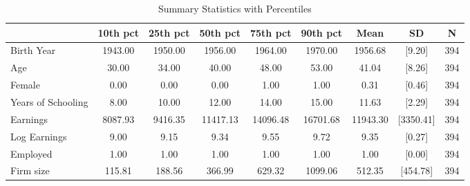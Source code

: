 \documentclass{article}
\begin{document}
\begin{table}[htbp] 
\centering 
\begin{threeparttable} 
\caption{Summary Statistics with Percentiles} 

\centering
\begin{tabular}{lllllllll}
\toprule
\multicolumn{1}{c}{} &
  \multicolumn{1}{c}{10th pct} &
  \multicolumn{1}{c}{25th pct} &
  \multicolumn{1}{c}{50th pct} &
  \multicolumn{1}{c}{75th pct} &
  \multicolumn{1}{c}{90th pct} &
  \multicolumn{1}{c}{Mean} &
  \multicolumn{1}{c}{SD} &
  \multicolumn{1}{c}{N} \\
\midrule
\multicolumn{1}{l}{Birth Year} &
  \multicolumn{1}{c}{1943.00} &
  \multicolumn{1}{c}{1950.00} &
  \multicolumn{1}{c}{1956.00} &
  \multicolumn{1}{c}{1964.00} &
  \multicolumn{1}{c}{1970.00} &
  \multicolumn{1}{c}{1956.68} &
  \multicolumn{1}{c}{[9.20]} &
  \multicolumn{1}{c}{394} \\
\multicolumn{1}{l}{Age} &
  \multicolumn{1}{c}{30.00} &
  \multicolumn{1}{c}{34.00} &
  \multicolumn{1}{c}{40.00} &
  \multicolumn{1}{c}{48.00} &
  \multicolumn{1}{c}{53.00} &
  \multicolumn{1}{c}{41.04} &
  \multicolumn{1}{c}{[8.26]} &
  \multicolumn{1}{c}{394} \\
\multicolumn{1}{l}{Female} &
  \multicolumn{1}{c}{0.00} &
  \multicolumn{1}{c}{0.00} &
  \multicolumn{1}{c}{0.00} &
  \multicolumn{1}{c}{1.00} &
  \multicolumn{1}{c}{1.00} &
  \multicolumn{1}{c}{0.31} &
  \multicolumn{1}{c}{[0.46]} &
  \multicolumn{1}{c}{394} \\
\multicolumn{1}{l}{Years of Schooling} &
  \multicolumn{1}{c}{8.00} &
  \multicolumn{1}{c}{10.00} &
  \multicolumn{1}{c}{12.00} &
  \multicolumn{1}{c}{14.00} &
  \multicolumn{1}{c}{15.00} &
  \multicolumn{1}{c}{11.63} &
  \multicolumn{1}{c}{[2.29]} &
  \multicolumn{1}{c}{394} \\
\multicolumn{1}{l}{Earnings} &
  \multicolumn{1}{c}{8087.93} &
  \multicolumn{1}{c}{9416.35} &
  \multicolumn{1}{c}{11417.13} &
  \multicolumn{1}{c}{14096.48} &
  \multicolumn{1}{c}{16701.68} &
  \multicolumn{1}{c}{11943.30} &
  \multicolumn{1}{c}{[3350.41]} &
  \multicolumn{1}{c}{394} \\
\multicolumn{1}{l}{Log Earnings} &
  \multicolumn{1}{c}{9.00} &
  \multicolumn{1}{c}{9.15} &
  \multicolumn{1}{c}{9.34} &
  \multicolumn{1}{c}{9.55} &
  \multicolumn{1}{c}{9.72} &
  \multicolumn{1}{c}{9.35} &
  \multicolumn{1}{c}{[0.27]} &
  \multicolumn{1}{c}{394} \\
\multicolumn{1}{l}{Employed} &
  \multicolumn{1}{c}{1.00} &
  \multicolumn{1}{c}{1.00} &
  \multicolumn{1}{c}{1.00} &
  \multicolumn{1}{c}{1.00} &
  \multicolumn{1}{c}{1.00} &
  \multicolumn{1}{c}{1.00} &
  \multicolumn{1}{c}{[0.00]} &
  \multicolumn{1}{c}{394} \\
\multicolumn{1}{l}{Firm size} &
  \multicolumn{1}{c}{115.81} &
  \multicolumn{1}{c}{188.56} &
  \multicolumn{1}{c}{366.99} &
  \multicolumn{1}{c}{629.32} &
  \multicolumn{1}{c}{1099.06} &
  \multicolumn{1}{c}{512.35} &
  \multicolumn{1}{c}{[454.78]} &
  \multicolumn{1}{c}{394} \\
\bottomrule
\end{tabular}

\end{threeparttable} 
\end{table}
\end{document}
